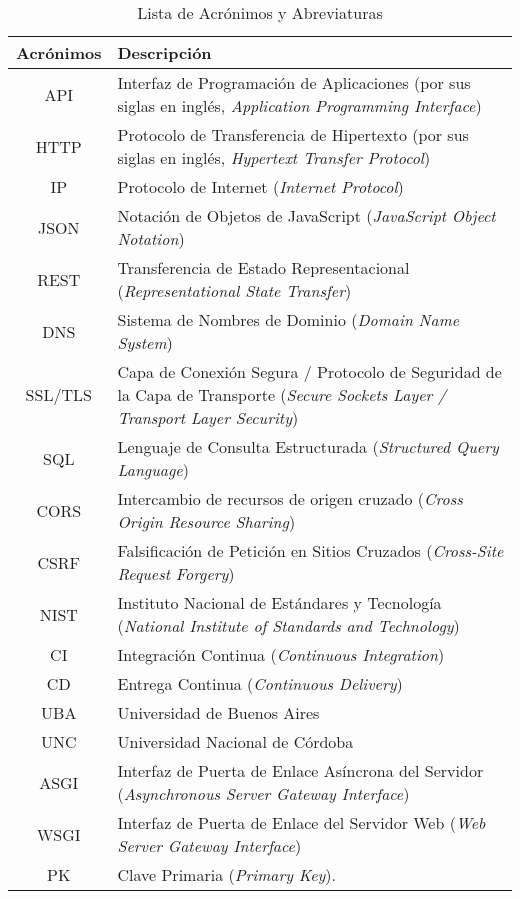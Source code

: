 \begin{table}[H]
    \centering
    \begin{tabular}{|c|p{10cm}|}
    \hline
         \textbf{Acrónimos} & \textbf{Descripción}\\
    \hline
         API & Interfaz de Programación de Aplicaciones (por sus siglas en inglés, \textit{Application Programming Interface})\\
    \hline
         HTTP & Protocolo de Transferencia de Hipertexto (por sus siglas en inglés, \textit{Hypertext Transfer Protocol})\\
    \hline
         IP & Protocolo de Internet (\textit{Internet Protocol})\\
    \hline
         JSON & Notación de Objetos de JavaScript (\textit{JavaScript Object Notation}) \\
    \hline
         REST & Transferencia de Estado Representacional (\textit{Representational State Transfer}) \\
    \hline
        DNS & Sistema de Nombres de Dominio (\textit{Domain Name System}) \\
    \hline
        SSL/TLS & Capa de Conexión Segura / Protocolo de Seguridad de la Capa de Transporte (\textit{Secure Sockets Layer / Transport Layer Security}) \\
    \hline
        SQL & Lenguaje de Consulta Estructurada (\textit{Structured Query Language}) \\
    \hline
        CORS & Intercambio de recursos de origen cruzado (\textit{Cross Origin Resource Sharing})\\
    \hline
         CSRF & Falsificación de Petición en Sitios Cruzados (\textit{Cross-Site Request Forgery}) \\
    \hline
         NIST & Instituto Nacional de Estándares y Tecnología (\textit{National Institute of Standards and Technology}) \\
    \hline
        CI & Integración Continua (\textit{Continuous Integration}) \\
    \hline
        CD & Entrega Continua (\textit{Continuous Delivery}) \\
    \hline
        UBA & Universidad de Buenos Aires \\
    \hline
        UNC & Universidad Nacional de Córdoba \\
    \hline
       ASGI & Interfaz de Puerta de Enlace Asíncrona del Servidor (\textit{Asynchronous Server Gateway Interface}) \\
    \hline
        WSGI & Interfaz de Puerta de Enlace del Servidor Web (\textit{Web Server Gateway Interface}) \\
    \hline
        PK & Clave Primaria (\textit{Primary Key}). \\
    \hline
        
    \end{tabular}
    \caption{Lista de Acrónimos y Abreviaturas}
    \label{tab:my_label}
\end{table}
